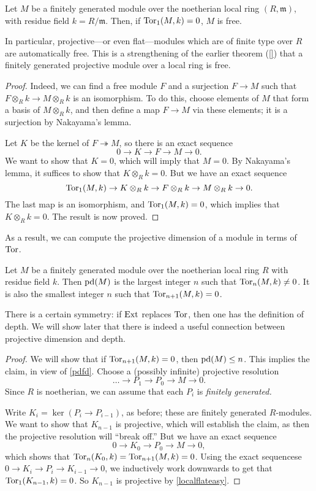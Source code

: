 \begin{theorem} \label{localflateasy}
Let $M$ be a finitely generated module over the noetherian local ring $(R,
\mathfrak{m})$, with residue field $k = R/\mathfrak{m}$. Then, if $\operatorname{Tor}_1(M, k)
= 0$, $M$ is free.
\end{theorem} 
In particular, projective---or even flat---modules which are of finite type
over $R$ are automatically free.
This is a strengthening of the earlier theorem (\cref{}) that a finitely
generated projective
module over a local ring is free.
\begin{proof} 
Indeed, we can find a free module $F$ and a surjection $F \to M$ such that $F
\otimes_R k \to M \otimes_R k$ is an isomorphism. To do this, choose elements
of $M$ that form a basis of $M \otimes_R k$, and then define a map $F \to M$
via these elements; it is a surjection by Nakayama's lemma.

Let $K$ be the kernel of $F \twoheadrightarrow M$, so there is an exact sequence 
\[ 0 \to K \to F \to M \to 0.  \]
We want to show that $K = 0$, which will imply that $M = 0$. By Nakayama's
lemma, it suffices to show that $K \otimes_R k = 0$. But we have an exact
sequence
\[ \operatorname{Tor}_1(M, k) \to K \otimes_R k \to F \otimes_R k \to M \otimes_R k \to 0.  \]
The last map is an isomorphism, and $\operatorname{Tor}_1(M, k) = 0$, which implies that $K
\otimes_R k = 0$. The result is now proved.
\end{proof} 

As a result, we can compute the projective dimension of a module in terms of
$\operatorname{Tor}$.
\begin{corollary} 
Let $M$ be a finitely generated module over the noetherian local ring $R$ with
residue field $k$. Then $\mathrm{pd}(M)$ is the largest integer $n$
such that 
$\operatorname{Tor}_n(M, k) \neq 0$.
It is also the smallest integer $n$ such that $\operatorname{Tor}_{n+1}(M, k) = 0$.
\end{corollary} 
There is a certain symmetry: if $\operatorname{Ext}$ replaces $\operatorname{Tor}$, then one has the
definition of depth. We will show later that there is indeed a useful connection
between projective dimension and depth.
\begin{proof} 
We will show that if
$\operatorname{Tor}_{n+1}(M, k) = 0$, then $\mathrm{pd}(M) \leq n$. 
This implies the claim, in view of \cref{pdfd}. Choose a (possibly infinite)
projective resolution
\[ \dots \to P_1 \to P_0 \to M \to 0.  \]
Since $R$ is noetherian, we can assume that each $P_i$ is \emph{finitely
generated.}

Write $K_i = \ker(P_i \to P_{i-1})$, as before; these are finitely generated
$R$-modules. We want to show that $K_{n-1}$
is projective, which will establish the claim, as then the projective
resolution will ``break off.''
But we have an exact sequence
\[ 0 \to K_0 \to P_0 \to M \to 0,  \]
which shows that $\operatorname{Tor}_n(K_0, k) = \operatorname{Tor}_{n+1}(M, k)= 0$. 
Using the exact sequencese $0 \to K_{i} \to P_i \to K_{i-1} \to 0$, we
inductively work downwards to get that $\operatorname{Tor}_1(K_{n-1}, k) =0$. So $K_{n-1}$ is
projective by \cref{localflateasy}.
\end{proof} 

